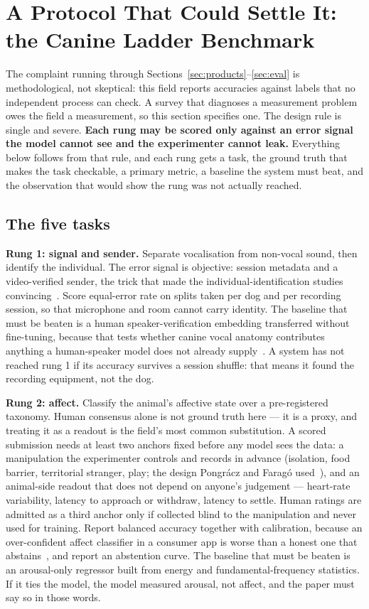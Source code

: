 \section{A Protocol That Could Settle It: the Canine Ladder Benchmark}
\label{sec:protocol}

The complaint running through Sections~\ref{sec:products}--\ref{sec:eval} is
methodological, not skeptical: this field reports accuracies against labels
that no independent process can check. A survey that diagnoses a measurement
problem owes the field a measurement, so this section specifies one. The
design rule is single and severe. \textbf{Each rung may be scored only against
an error signal the model cannot see and the experimenter cannot leak.}
Everything below follows from that rule, and each rung gets a task, the ground
truth that makes the task checkable, a primary metric, a baseline the system
must beat, and the observation that would show the rung was not actually
reached.

\subsection{The five tasks}

\textbf{Rung 1: signal and sender.} Separate vocalisation from non-vocal sound,
then identify the individual. The error signal is objective: session metadata
and a video-verified sender, the trick that made the individual-identification
studies convincing~\cite{molnar2006discriminate}. Score equal-error rate on
splits taken per dog and per recording session, so that microphone and room
cannot carry identity. The baseline that must be beaten is a human
speaker-verification embedding transferred without fine-tuning, because that
tests whether canine vocal anatomy contributes anything a human-speaker model
does not already supply~\cite{snyder2018xvector}. A system has not reached
rung 1 if its accuracy survives a session shuffle: that means it found the
recording equipment, not the dog.

\textbf{Rung 2: affect.} Classify the animal's affective state over a
pre-registered taxonomy. Human consensus alone is not ground truth here --- it
is a proxy, and treating it as a readout is the field's most common
substitution. A scored submission needs at least two anchors fixed before any
model sees the data: a manipulation the experimenter controls and records in
advance (isolation, food barrier, territorial stranger, play; the design
Pongr\'acz and Farag\'o used~\cite{pongracz2005barks,farago2017growls}), and an
animal-side readout that does not depend on anyone's judgement --- heart-rate
variability, latency to approach or withdraw, latency to settle. Human ratings
are admitted as a third anchor only if collected blind to the manipulation and
never used for training. Report balanced accuracy together with calibration,
because an over-confident affect classifier in a consumer app is worse than a
honest one that abstains~\cite{guo2017calibration}, and report an abstention
curve. The baseline that must be beaten is an arousal-only regressor built from
energy and fundamental-frequency statistics. If it ties the model, the model
measured arousal, not affect, and the paper must say so in those words.

